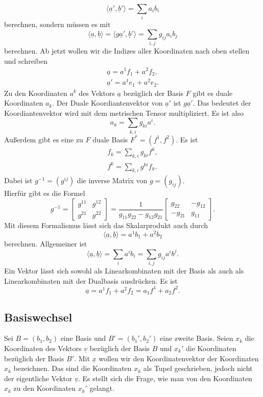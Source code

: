 \documentclass[a4paper,10pt,fleqn,twocolumn,twoside]{article}
\begin{document}
\[\langle\underline a',\underline b'\rangle = \sum_{i}a_ib_i\]
\noindent
berechnen, sondern müssen es mit
\[\langle\underline a,\underline b\rangle
= \langle g\underline a',\underline b'\rangle
= \sum_{i,j} g_{ij}a_ib_j\]
\noindent
berechnen. Ab jetzt wollen wir die Indizes aller Koordinaten
nach oben stellen und schreiben
\begin{gather*}
\underline a = a^1f_1+a^2f_2,\\
\underline a'= a^1e_1+a^2e_2.
\end{gather*}
\noindent
Zu den Koordinaten \(a^k\) des Vektors \(\underline a\) bezüglich der
Basis \(F\) gibt es duale Koordinaten \(a_k\). Der Duale
Koordiantenvektor von \(\underline a'\) ist \(g\underline a'\).
Das bedeutet der Koordiantenvektor wird mit dem metrischen Tensor
multipliziert. Es ist also
\[a_k = \sum_{k,i}g_{ki}a^i.\]
\noindent
Außerdem gibt es eine zu \(F\) duale Basis \(F^\ast=(f^1,f^2)\).
Es ist
\begin{gather*}
f_k = \sum_{k,i}g_{ki}f^k,\\
f^k = \sum_{k,i}g^{ki}f_k.
\end{gather*}
\noindent
Dabei ist \(g^{-1} = (g^{ij})\) die inverse Matrix von
\(g=(g_{ij})\).\\
Hierfür gibt es die Formel
\[g^{-1} = \begin{bmatrix}
g^{11} & g^{12}\\
g^{21} & g^{22}
\end{bmatrix}
= \frac{1}{g_{11}g_{22}-g_{12}g_{21}}
\begin{bmatrix}
g_{22} & -g_{12}\\
-g_{21} & g_{11}
\end{bmatrix}.\]
\noindent
Mit diesem Formalismus lässt sich das Skalarprodukt auch durch
\[\langle\underline a,\underline b\rangle = a^1b_1+a^2b_2\]
\noindent
berechnen. Allgemeiner ist
\[\langle\underline a,\underline b\rangle
= \sum_{i} a^ib_i = \sum_{i,j}g_{ij}a^ib^j.\]
\noindent
Ein Vektor lässt sich sowohl als Linearkombinaten mit der Basis
als auch als Linearkombinaten mit der Dualbasis ausdrücken. Es ist
\[\underline a = a^1f_1+a^2f_2 = a_1f^1+a_2f^2.\]

\subsection{Basiswechsel}

Sei \(B=(b_1,b_2)\) eine Basis und \(B'=(b_1',b_2')\) eine zweite
Basis. Seien \(x_k\) die Koordinaten des Vektors \(\underline v\)
bezüglich der Basis \(B\) und \(x_k'\) die Koordinaten bezüglich der
Basis \(B'\). Mit \(\underline x\) wollen wir den Koordinatenvektor
der Koordinaten \(x_k\) bezeichnen. Das sind die Koordinaten \(x_k\)
als Tupel geschrieben, jedoch nicht der
eigentliche Vektor \(\underline v\). Es stellt sich die Frage, wie man
von den Koordinaten \(x_k\) zu den Koordinaten \(x_k'\) gelangt.
\end{document}

